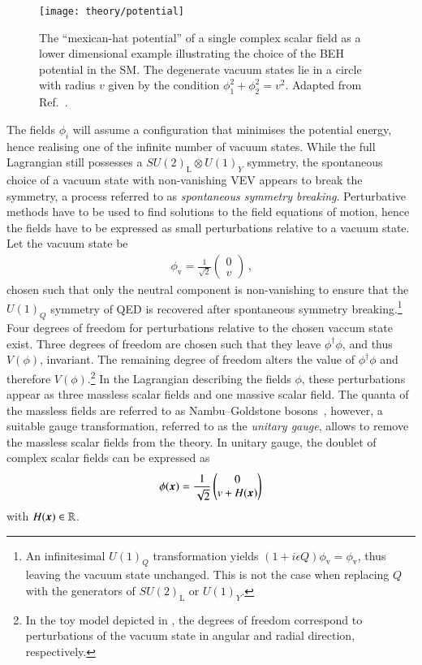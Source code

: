 \begin{figure}[htbp]
  \centering

  \texttt{[image: theory/potential]}

  \caption{The ``mexican-hat potential'' of a single complex scalar field as a
    lower dimensional example illustrating the choice of the BEH potential in
    the SM. The degenerate vacuum states lie in a circle with radius $v$ given
    by the condition $\phi_1^2 + \phi_2^2 = v^2$. Adapted from
    Ref.~\cite{higgs_potential_tikz}.}%
  \label{fig:mexican_hat}
\end{figure}

The fields $\phi_i$ will assume a configuration that minimises the potential
energy, hence realising one of the infinite number of vacuum states. While the
full Lagrangian still possesses a $SU(2)_{\text{L}} \otimes U(1)_Y$ symmetry,
the spontaneous choice of a vacuum state with non-vanishing VEV appears to break
the symmetry, a process referred to as \emph{spontaneous symmetry
  breaking}. Perturbative methods have to be used to find solutions to the field
equations of motion, hence the fields have to be expressed as small
perturbations relative to a vacuum state. Let the vacuum state be
\begin{align*}
  \phi_{\text{v}} = \frac{1}{\sqrt{2}}
  \begin{pmatrix}
    0 \\
    v
  \end{pmatrix} \,\text{,}
\end{align*}
chosen such that only the neutral component is non-vanishing to ensure that the
$U(1)_Q$ symmetry of QED is recovered after spontaneous symmetry
breaking.\footnote{An infinitesimal $U(1)_Q$ transformation yields
  $(1 + i \epsilon Q) \phi_{\text{v}} = \phi_{\text{v}}$, thus leaving the
  vacuum state unchanged. This is not the case when replacing $Q$ with the
  generators of $SU(2)_{\text{L}}$ or $U(1)_Y$.} Four degrees of freedom for
perturbations relative to the chosen vaccum state exist. Three degrees of
freedom are chosen such that they leave $\phi^\dagger \phi$, and thus $V(\phi)$,
invariant. The remaining degree of freedom alters the value of
$\phi^\dagger \phi$ and therefore $V(\phi)$.\footnote{In the toy model depicted
  in , the degrees of freedom correspond to perturbations
  of the vacuum state in angular and radial direction, respectively.} In the
Lagrangian describing the fields $\phi$, these perturbations appear as three
massless scalar fields and one massive scalar field. The quanta of the massless
fields are referred to as Nambu--Goldstone
bosons~\cite{Nambu:1960tm,Goldstone:1961eq}, however, a suitable gauge
transformation, referred to as the \emph{unitary gauge}, allows to remove the
massless scalar fields from the theory. In unitary gauge, the doublet of complex
scalar fields can be expressed as
\begin{align}
  \phi(\myvec{x}) = \frac{1}{\sqrt{2}}
  \begin{pmatrix}
    0 \\
    v + H(\myvec{x})
  \end{pmatrix}
  \label{eq:vacuum_state_perturb}
\end{align}
with $H(\myvec{x}) \in \mathbb{R}$.

